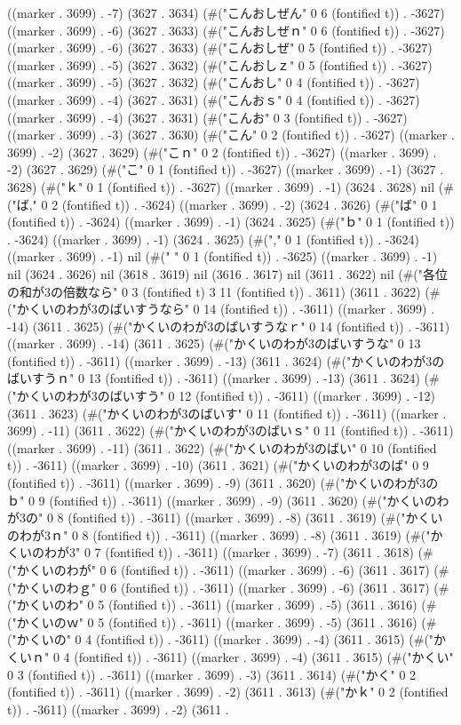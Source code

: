 ((marker . 3699) . -7) (3627 . 3634) (#("こんおしぜん" 0 6 (fontified t)) . -3627) ((marker . 3699) . -6) (3627 . 3633) (#("こんおしぜｎ" 0 6 (fontified t)) . -3627) ((marker . 3699) . -6) (3627 . 3633) (#("こんおしぜ" 0 5 (fontified t)) . -3627) ((marker . 3699) . -5) (3627 . 3632) (#("こんおしｚ" 0 5 (fontified t)) . -3627) ((marker . 3699) . -5) (3627 . 3632) (#("こんおし" 0 4 (fontified t)) . -3627) ((marker . 3699) . -4) (3627 . 3631) (#("こんおｓ" 0 4 (fontified t)) . -3627) ((marker . 3699) . -4) (3627 . 3631) (#("こんお" 0 3 (fontified t)) . -3627) ((marker . 3699) . -3) (3627 . 3630) (#("こん" 0 2 (fontified t)) . -3627) ((marker . 3699) . -2) (3627 . 3629) (#("こｎ" 0 2 (fontified t)) . -3627) ((marker . 3699) . -2) (3627 . 3629) (#("こ" 0 1 (fontified t)) . -3627) ((marker . 3699) . -1) (3627 . 3628) (#("ｋ" 0 1 (fontified t)) . -3627) ((marker . 3699) . -1) (3624 . 3628) nil (#("ば," 0 2 (fontified t)) . -3624) ((marker . 3699) . -2) (3624 . 3626) (#("ば" 0 1 (fontified t)) . -3624) ((marker . 3699) . -1) (3624 . 3625) (#("ｂ" 0 1 (fontified t)) . -3624) ((marker . 3699) . -1) (3624 . 3625) (#("," 0 1 (fontified t)) . -3624) ((marker . 3699) . -1) nil (#(" " 0 1 (fontified t)) . -3625) ((marker . 3699) . -1) nil (3624 . 3626) nil (3618 . 3619) nil (3616 . 3617) nil (3611 . 3622) nil (#("各位の和が3の倍数なら" 0 3 (fontified t) 3 11 (fontified t)) . 3611) (3611 . 3622) (#("かくいのわが3のばいすうなら" 0 14 (fontified t)) . -3611) ((marker . 3699) . -14) (3611 . 3625) (#("かくいのわが3のばいすうなｒ" 0 14 (fontified t)) . -3611) ((marker . 3699) . -14) (3611 . 3625) (#("かくいのわが3のばいすうな" 0 13 (fontified t)) . -3611) ((marker . 3699) . -13) (3611 . 3624) (#("かくいのわが3のばいすうｎ" 0 13 (fontified t)) . -3611) ((marker . 3699) . -13) (3611 . 3624) (#("かくいのわが3のばいすう" 0 12 (fontified t)) . -3611) ((marker . 3699) . -12) (3611 . 3623) (#("かくいのわが3のばいす" 0 11 (fontified t)) . -3611) ((marker . 3699) . -11) (3611 . 3622) (#("かくいのわが3のばいｓ" 0 11 (fontified t)) . -3611) ((marker . 3699) . -11) (3611 . 3622) (#("かくいのわが3のばい" 0 10 (fontified t)) . -3611) ((marker . 3699) . -10) (3611 . 3621) (#("かくいのわが3のば" 0 9 (fontified t)) . -3611) ((marker . 3699) . -9) (3611 . 3620) (#("かくいのわが3のｂ" 0 9 (fontified t)) . -3611) ((marker . 3699) . -9) (3611 . 3620) (#("かくいのわが3の" 0 8 (fontified t)) . -3611) ((marker . 3699) . -8) (3611 . 3619) (#("かくいのわが3ｎ" 0 8 (fontified t)) . -3611) ((marker . 3699) . -8) (3611 . 3619) (#("かくいのわが3" 0 7 (fontified t)) . -3611) ((marker . 3699) . -7) (3611 . 3618) (#("かくいのわが" 0 6 (fontified t)) . -3611) ((marker . 3699) . -6) (3611 . 3617) (#("かくいのわｇ" 0 6 (fontified t)) . -3611) ((marker . 3699) . -6) (3611 . 3617) (#("かくいのわ" 0 5 (fontified t)) . -3611) ((marker . 3699) . -5) (3611 . 3616) (#("かくいのｗ" 0 5 (fontified t)) . -3611) ((marker . 3699) . -5) (3611 . 3616) (#("かくいの" 0 4 (fontified t)) . -3611) ((marker . 3699) . -4) (3611 . 3615) (#("かくいｎ" 0 4 (fontified t)) . -3611) ((marker . 3699) . -4) (3611 . 3615) (#("かくい" 0 3 (fontified t)) . -3611) ((marker . 3699) . -3) (3611 . 3614) (#("かく" 0 2 (fontified t)) . -3611) ((marker . 3699) . -2) (3611 . 3613) (#("かｋ" 0 2 (fontified t)) . -3611) ((marker . 3699) . -2) (3611 . 